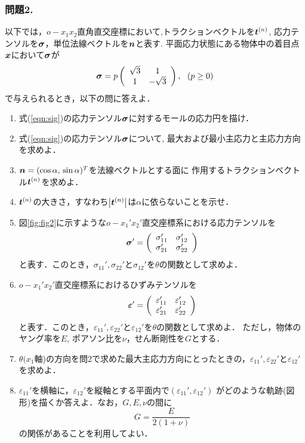 \documentclass[10pt,a4j]{jarticle}
\begin{document}
\subsubsection*{問題2.}
以下では，$o-x_1x_2$直角直交座標において,トラクションベクトルを$\mbox{\boldmath $t$}^{(n)}$, 
応力テンソルを$\mbox{\boldmath $\sigma$}$，単位法線ベクトルを$\mbox{\boldmath $n$}$と表す.
平面応力状態にある物体中の着目点$\mbox{\boldmath $x$}$において$\mbox{\boldmath $\sigma$}$が
\begin{equation}
	\mbox{\boldmath $\sigma$}=
	p
	\left(
	\begin{array}{cc}
		\sqrt{3} &  1 \\
		1 & -\sqrt{3} 
	\end{array}
	\right), \ \ (p \geq 0)
	\label{eqn:sig}
\end{equation}
で与えられるとき，以下の問に答えよ．
\begin{enumerate}
\item
	式(\ref{eqn:sig})の応力テンソル$\mbox{\boldmath $\sigma$}$に対するモールの応力円を描け．
\item
	式(\ref{eqn:sig})の応力テンソル$\mbox{\boldmath $\sigma$}$について, 最大および最小主応力と主応力方向を求めよ．
\item
	$\mbox{\boldmath $n$}=(\cos\alpha,\, \sin\alpha)^T$を法線ベクトルとする面に
	作用するトラクションベクトル$\mbox{\boldmath $t$}^{(n)}$を求めよ．
\item 
	$\mbox{\boldmath $t$}^{(n)}$の大きさ，すなわち$\left| \mbox{\boldmath $t$}^{(n)}\right|$は$\alpha$に依らないことを示せ．
\item
	図\ref{fig:fig2}に示すような$o-x_1'x_2'$直交座標系における応力テンソルを
	\begin{equation}
	\mbox{\boldmath $\sigma$}'=
	\left(
	\begin{array}{cc}
		\sigma_{11}' &  \sigma_{12}' \\
		\sigma_{21}' &  \sigma_{22}' 
	\end{array}
	\right)
	\label{eqn:sigd}
	\end{equation}
		と表す．このとき，$\sigma_{11}',\sigma_{22}'$と$\sigma_{12}'$を$\theta$の関数として求めよ．
\item
	$o-x_1'x_2'$直交座標系におけるひずみテンソルを
	\begin{equation}
	\mbox{\boldmath $\varepsilon$}'=
	\left(
	\begin{array}{cc}
		\varepsilon_{11}' &  \varepsilon_{12}' \\
		\varepsilon_{21}' &  \varepsilon_{22}' 
	\end{array}
	\right)
	\label{eqn:epsd}
	\end{equation}
	と表す．このとき，$\varepsilon_{11}',\varepsilon_{22}'$と$\varepsilon_{12}'$を$\theta$の関数として求めよ．
	ただし，物体のヤング率を$E$, ポアソン比を$\nu$，せん断剛性を$G$とする．
\item
	$\theta(x_1$軸)の方向を問2で求めた最大主応力方向にとったときの，$\varepsilon_{11}',\varepsilon_{22}'$と$\varepsilon_{12}'$
		を求めよ．
\item
	$\varepsilon_{11}'$を横軸に，$\varepsilon_{12}'$を縦軸とする平面内で$(\varepsilon_{11}',\varepsilon_{12}')$
	がどのような軌跡(図形)を描くか答えよ．なお，$G,E,\nu$の間に
	\begin{equation}
		G=\frac{E}{2(1+\nu)}
	\end{equation}
	の関係があることを利用してよい．
\end{enumerate}
\end{document}
